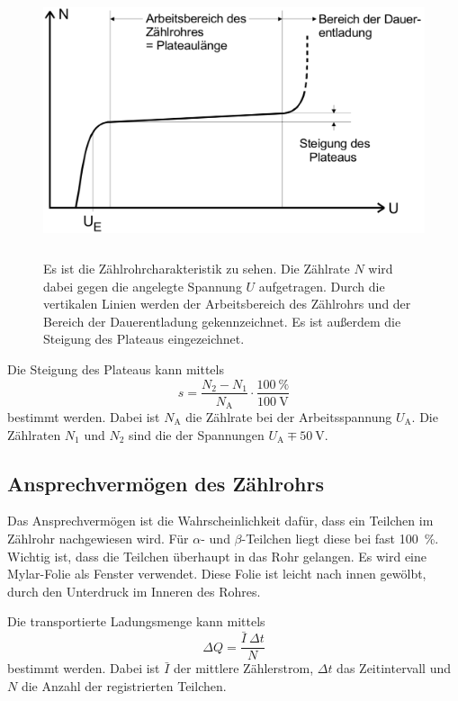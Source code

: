 \begin{figure}
    \centering
    \includegraphics[width=12cm, height=8cm]{build/charakteristik.png}
    \caption{Es ist die Zählrohrcharakteristik zu sehen. Die Zählrate $N$ wird dabei gegen die angelegte Spannung $U$ aufgetragen. Durch die vertikalen Linien werden der Arbeitsbereich des Zählrohrs und der Bereich der Dauerentladung gekennzeichnet. Es ist außerdem die Steigung des Plateaus eingezeichnet. \cite{V703}}
    \label{fig:charakteristik}
\end{figure}

\noindent Die Steigung des Plateaus kann mittels
\begin{equation}
    s = \frac{N_2 - N_1}{N_\text{A}} \cdot \frac{\SI{100}{\percent}}{\SI{100}{\volt}}
    \label{steigung}
\end{equation}
bestimmt werden. Dabei ist $N_\text{A}$ die Zählrate bei der Arbeitsspannung $U_\text{A}$. Die Zählraten $N_1$ und $N_2$ sind die der Spannungen $U_\text{A} \mp \SI{50}{\volt}$.

\subsection{Ansprechvermögen des Zählrohrs}

Das Ansprechvermögen ist die Wahrscheinlichkeit dafür, dass ein Teilchen im Zählrohr nachgewiesen wird. Für $\alpha$- und $\beta$-Teilchen liegt diese bei fast \SI{100}{\percent}. Wichtig ist, dass die Teilchen überhaupt in das Rohr gelangen. Es wird eine Mylar-Folie als Fenster verwendet. Diese Folie ist leicht nach innen gewölbt, durch den Unterdruck im Inneren des Rohres. %


Die transportierte Ladungsmenge kann mittels
\begin{equation}
    \Delta Q = \frac{\bar{I} \ \Delta t}{N}
    \label{ladung}
\end{equation}
bestimmt werden. Dabei ist $\bar{I}$ der mittlere Zählerstrom, $\Delta t$ das Zeitintervall und $N$ die Anzahl der registrierten Teilchen.